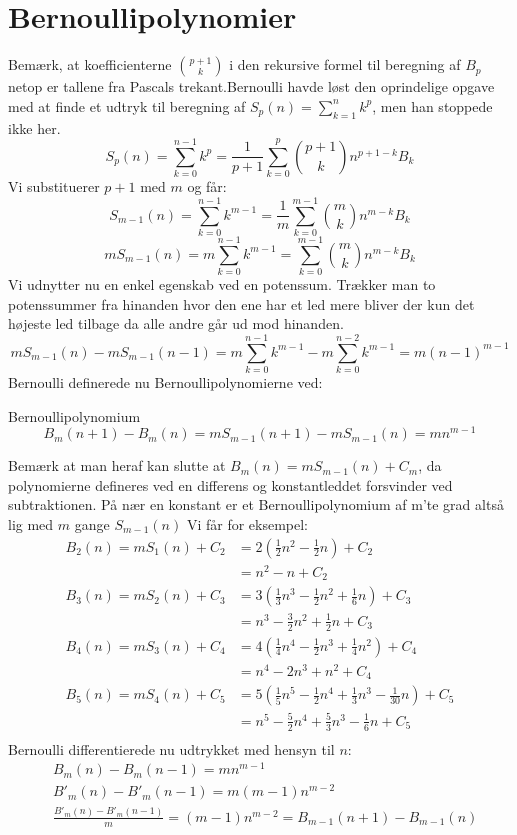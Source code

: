 \section{Bernoullipolynomier}
Bemærk, at koefficienterne \(\binom{p+1}{k}\) i den rekursive formel til beregning af \(B_{p}\) netop er tallene fra Pascals trekant.Bernoulli havde løst den oprindelige opgave med at finde et udtryk til beregning af \(S_{p}(n)=\sum _{k=1}^{n}k^{p}\), men han stoppede ikke her. 
\[S_{p}(n)=\sum_{k=0}^{n-1}k^{p}=\frac{1}{p+1}\sum_{k=0}^{p}\binom{p+1}{k}n^{p+1-k}B_{k}\]
Vi substituerer \(p+1\) med \(m\) og får:
\[S_{m-1}(n)=\sum_{k=0}^{n-1}k^{m-1}=\frac{1}{m}\sum_{k=0}^{m-1}\binom{m}{k}n^{m-k}B_{k}\]
\[mS_{m-1}(n)=m\sum_{k=0}^{n-1}k^{m-1}=\sum_{k=0}^{m-1}\binom{m}{k}n^{m-k}B_{k}\]
Vi udnytter nu en enkel egenskab ved en potenssum. Trækker man to potenssummer fra hinanden hvor den ene har et led mere bliver der kun det højeste led tilbage da alle andre går ud mod hinanden. 
\[mS_{m-1}(n)- mS_{m-1}(n-1)=m\sum_{k=0}^{n-1}k^{m-1}- m\sum_{k=0}^{n-2}k^{m-1}=m(n-1)^{m-1}\]
Bernoulli definerede nu Bernoullipolynomierne ved:
\begin{definition} Bernoullipolynomium
\[B_{m}(n+1)-B_{m}(n)=mS_{m-1}(n+1)-mS_{m-1}(n)=mn^{m-1}\]
\end{definition}
Bemærk at man heraf kan slutte at \(B_{m}(n)=mS_{m-1}(n)+C_{m}\), da polynomierne defineres ved en differens og konstantleddet forsvinder ved subtraktionen.  
På nær en konstant er et Bernoullipolynomium af m’te grad altså lig med \(m\) gange \(S_{m-1}(n)\)
Vi får for eksempel:
\begin{align*}
B_{2}(n)=mS_{1}(n)+C_{2}&=2(\frac{1}{2}n^{2}-\frac{1}{2}n)+C_{2}\\
&=n^{2}-n+C_{2}\\
B_{3}(n)=mS_{2}(n)+C_{3}&=3(\frac{1}{3}n^{3}-\frac{1}{2}n^{2}+\frac{1}{6}n)+C_{3}\\
&=n^{3}-\frac{3}{2}n^{2}+\frac{1}{2}n+C_{3}\\
B_{4}(n)=mS_{3}(n)+C_{4}&=4(\frac{1}{4}n^{4}-\frac{1}{2}n^{3}+\frac{1}{4}n^{2})+C_{4}\\
&=n^{4}-2n^{3}+n^{2}+C_{4}\\
B_{5}(n)=mS_{4}(n)+C_{5}&=5(\frac{1}{5}n^{5}-\frac{1}{2}n^{4}+\frac{1}{3}n^{3}-\frac{1}{30}n)+C_{5}\\
&=n^{5}-\frac{5}{2}n^{4}+\frac{5}{3}n^{3}-\frac{1}{6}n+C_{5}\\
\end{align*}
Bernoulli differentierede nu udtrykket med hensyn til \(n\): 
\begin{align*}
&B_{m}(n)-B_{m}(n-1)=mn^{m-1}\\
&B'_{m}(n)-B'_{m}(n-1)=m(m-1)n^{m-2}\\
&\frac{B'_{m}(n)-B'_{m}(n-1)}{m}=(m-1)n^{m-2}=B_{m-1}(n+1)-B_{m-1}(n)
\end{align*}
